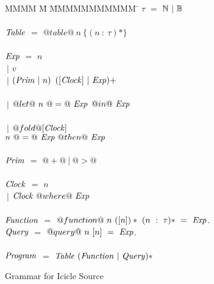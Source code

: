 
\begin{figure}

\begin{tabbing}
MMMM \= M \= MMMMMMMMMMM \= \kill
$\tau$          \> $=$  \> $\mathbb{N}~|~\mathbb{B}$ \\
\\
$\mathit{Table}$    \> $=$  \> $@table@~n~\{(n~:~\tau)*\}$ \\
\\
$\mathit{Exp}$
    \> $=$  \> $n$          \\
    \> $~|$ \> $v$     \\
    \> $~|$ \> $(\mathit{Prim}~|~n)$     \> $([\mathit{Clock}]~|~\mathit{Exp})+$ \\
\\
    \> $~|$ \> $@let@~n~@=@~\mathit{Exp}$
            \> $@in@~\mathit{Exp}$ \\
                \\
    \> $~|$ \> $@fold@[\mathit{Clock}]$ \\
    \>      \> $n~@=@~\mathit{Exp}~@then@~\mathit{Exp}$
\\
\\
$\mathit{Prim}$
    \> $=$  \> $@+@~|~@>@$ \\
\\
$\mathit{Clock}$
    \> $=$  \> $n$          \\
    \> $~|$ \> $\mathit{Clock}~@where@~\mathit{Exp}$          \\
\\
$\mathit{Function}$
    \> $=$  \> $@function@~n~([n])*~(n~:~\tau)*~=~\mathit{Exp}$.          \\

$\mathit{Query}$
    \> $=$  \> $@query@~n~[n]~=~\mathit{Exp}$.          \\
\\
$\mathit{Program}$
    \> $=$  \> $\mathit{Table}~(\mathit{Function}~|~\mathit{Query})*$ \\
\end{tabbing}


\caption{Grammar for Icicle Source}
\label{fig:source:grammar}
\end{figure}


